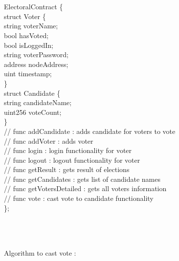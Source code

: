 \documentclass[oneside, 12pt]{book}
\begin{document}
			\\\\\colorbox{gray!20}{%
		        \begin{minipage}{\linewidth}%
		            \vspace*{2pt}
		            	ElectoralContract \{
    \\struct Voter \{
        \\string voterName;
        \\bool hasVoted;
        \\bool isLoggedIn;
        \\string voterPassword;
        \\address nodeAddress;
        \\uint timestamp;
    \\\}
    \\struct Candidate \{
        \\string candidateName;
        \\uint256 voteCount;
    \\\}
    \\// func addCandidate : adds candidate for voters to vote
    \\// func addVoter : adds voter
    \\// func login : login functionality for voter
    \\// func logout : logout functionality for voter
    \\// func getResult : gets result of elections
    \\// func getCandidates : gets list of candidate names
    \\// func getVotersDetailed : gets all voters information
    \\// func vote : cast vote to candidate functionality
\\\};
		            \vspace*{2pt}
		        \end{minipage}%
		    }
			\\\\\\Algorithm to cast vote :
\end{document}
